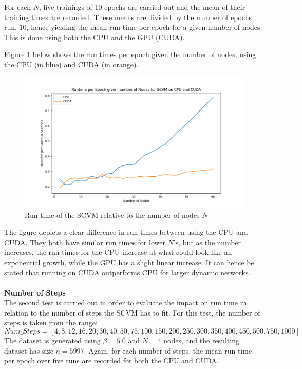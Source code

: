 For each $N$, five trainings of 10 epochs are carried out and the mean of their training times are recorded.
These means are divided by the number of epochs run, 10, hence yielding the mean run time per epoch for a given number of nodes.
This is done using both the CPU and the GPU (CUDA).

Figure \ref{fig:NumNodesRuntimes} below shows the run times per epoch given the number of nodes, using the CPU (in blue) and CUDA (in orange).

\begin{figure}[H]
    \centering
    \includegraphics[width=\textwidth]{0_images/numnodes_runtime2.png}
    \caption{Run time of the SCVM relative to the number of nodes $N$}
    \label{fig:NumNodesRuntimes}
\end{figure}
The figure depicts a clear difference in run times between using the CPU and CUDA.
They both have similar run times for lower $N$'s, but as the number increases, the run times for the CPU increase at what could look like an exponential growth, while the GPU has a slight linear increase.
It can hence be stated that running on CUDA outperforms CPU for larger dynamic networks.
\\\\
\textbf{Number of Steps}
\\
The second test is carried out in order to evaluate the impact on run time in relation to the number of steps the SCVM has to fit.
For this test, the number of steps is taken from the range:
\begin{equation}
    Num\_Steps = [4,8,12,16,20,30,40,50,75,100,150,200,250,300,350,400,450,500,750,1000]
\end{equation}
The dataset is generated using $\beta = 5.0$ and $N = 4$ nodes, and the resulting dataset has size $n = 5997$.
Again, for each number of steps, the mean run time per epoch over five runs are recorded for both the CPU and CUDA.


